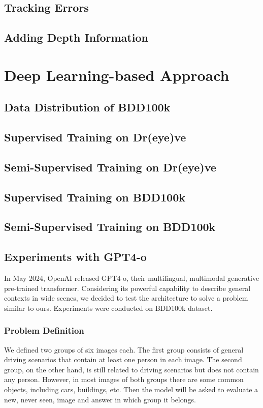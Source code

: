 \subsection{Tracking Errors}
\subsection{Adding Depth Information}

\section {Deep Learning-based Approach}
\subsection {Data Distribution of BDD100k}
\subsection{Supervised Training on Dr(eye)ve}
\subsection{Semi-Supervised Training on Dr(eye)ve}
\subsection{Supervised Training on BDD100k}
\subsection{Semi-Supervised Training on BDD100k}

\subsection{Experiments with GPT4-o}
In May 2024, OpenAI released GPT4-o, their multilingual, multimodal generative 
pre-trained transformer. Considering its powerful capability to describe general 
contexts in wide scenes, we decided to test the architecture to solve a problem 
similar to ours. Experiments were conducted on BDD100k dataset.

\subsubsection{Problem Definition}
We defined two groups of six images each. The first group consists of general 
driving scenarios that contain at least one person in each image. 
The second group, on the other hand, is still related to driving scenarios but 
does not contain any person. However, in most images of both groups there are 
some common objects, including cars, buildings, etc.
Then the model will be asked to evaluate a new, never seen, image and answer 
in which group it belongs.

